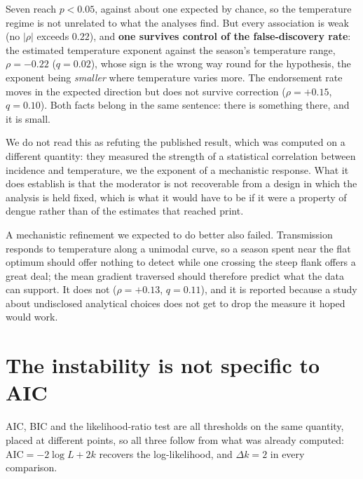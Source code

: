 \documentclass[11pt,a4paper]{article}
\begin{document}
Seven reach $p < 0.05$, against about one expected by chance, so the temperature
regime is not unrelated to what the analyses find. But every association is weak
 (no $|\rho|$ exceeds $0.22$), and \textbf{one survives control of the
false-discovery rate}: the estimated temperature exponent against the season's
temperature range, $\rho = -0.22$ ($q = 0.02$), whose sign is the wrong way round
for the hypothesis, the exponent being \emph{smaller} where temperature varies
more. The endorsement rate moves in the expected direction but does not survive
correction ($\rho = +0.15$, $q = 0.10$). Both facts belong in the same sentence:
there is something there, and it is small.

We do not read this as refuting the published result, which was computed on a
different quantity: they measured the strength of a statistical correlation
between incidence and temperature, we the exponent of a mechanistic response.
What it does establish is that the moderator is not recoverable from a design in
which the analysis is held fixed, which is what it would have to be if it were
a property of dengue rather than of the estimates that reached print.

A mechanistic refinement we expected to do better also failed. Transmission
responds to temperature along a unimodal curve, so a season spent near the flat
optimum should offer nothing to detect while one crossing the steep flank offers
a great deal; the mean gradient traversed should therefore predict what the data
can support. It does not ($\rho = +0.13$, $q = 0.11$), and it is reported because
a study about undisclosed analytical choices does not get to drop the measure it
hoped would work.

\section{The instability is not specific to AIC}

AIC, BIC and the likelihood-ratio test are all thresholds on the same quantity,
placed at different points, so all three follow from what was already computed:
$\mathrm{AIC} = -2\log L + 2k$ recovers the log-likelihood, and $\Delta k = 2$ in
every comparison.
\end{document}
